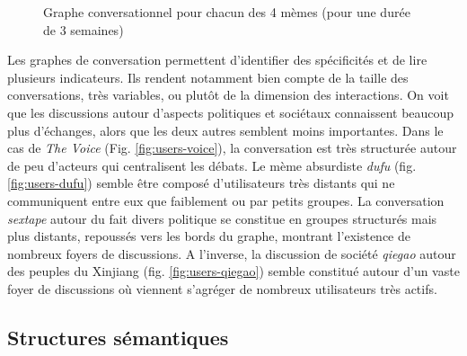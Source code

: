 \begin{figure}[h!]
{    }
    
  \caption{  
    Graphe conversationnel pour chacun des 4 m\`emes (pour une dur\'ee de 3 semaines)
  }
\end{figure}

Les graphes de conversation permettent d{\textquoteright}identifier des sp\'ecificit\'es et de lire plusieurs indicateurs. Ils rendent notamment bien compte de la taille des conversations, tr\`es variables, ou plut\^ot de la dimension des interactions. On voit que les discussions autour d{\textquoteright}aspects politiques et soci\'etaux connaissent beaucoup plus d{\textquoteright}\'echanges, alors que les deux autres semblent moins importantes. Dans le cas de \textit{The Voice} (Fig. \ref{fig:users-voice}), la conversation est tr\`es structur\'ee autour de peu d{\textquoteright}acteurs qui centralisent les d\'ebats. Le m\`eme absurdiste \textit{dufu} (fig. \ref{fig:users-dufu}) semble \^etre compos\'e d{\textquoteright}utilisateurs tr\`es distants qui ne communiquent entre eux que faiblement ou par petits groupes. La conversation \textit{sextape }autour du fait divers politique se constitue en groupes structur\'es mais plus distants, repouss\'es vers les bords du graphe, montrant l{\textquoteright}existence de nombreux foyers de discussions. A l{\textquoteright}inverse, la discussion de soci\'et\'e \textit{qiegao}\textit{ }autour des peuples du Xinjiang (fig. \ref{fig:users-qiegao}) semble constitu\'e autour d{\textquoteright}un vaste foyer de discussions o\`u viennent s{\textquoteright}agr\'eger de nombreux utilisateurs tr\`es actifs. 

\subsection[Structures s\'emantiques]{Structures s\'emantiques}

